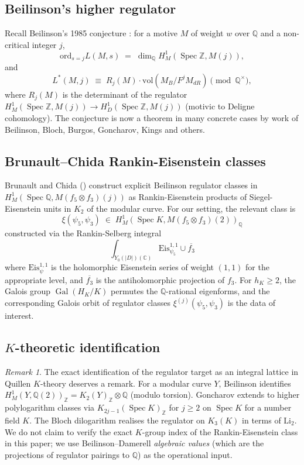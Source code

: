 \documentclass[11pt]{amsart}
\theoremstyle{definition}
\theoremstyle{remark}
\newtheorem{remark}[theorem]{Remark}
\DeclareMathOperator{\Gal}{Gal}
\DeclareMathOperator{\Spec}{Spec}
\newcommand{\Q}{\mathbb{Q}}
\newcommand{\Z}{\mathbb{Z}}
\newcommand{\C}{\mathbb{C}}
\newcommand{\HK}{H_K}
\newcommand{\Li}{\mathrm{Li}}
\begin{document}
\subsection{Beilinson's higher regulator}\label{ss:beilinson-regulator}

Recall Beilinson's 1985 conjecture \cite{Beilinson1985}: for a motive $M$
of weight $w$ over $\Q$ and a non-critical integer $j$,
\[
\mathrm{ord}_{s=j} L(M, s) \;=\; \dim_\Q H^1_M(\Spec \Z, M(j)),
\]
and
\[
L^*(M, j) \;\equiv\; R_j(M) \cdot \mathrm{vol}(M_B / F^j M_{dR})
\pmod{\Q^\times},
\]
where $R_j(M)$ is the determinant of the regulator
$H^1_M(\Spec \Z, M(j)) \to H^1_D(\Spec \Z, M(j))$ (motivic to Deligne
cohomology). The conjecture is now a theorem in many concrete cases by work
of Beilinson, Bloch, Burgos, Goncharov, Kings and others.

\subsection{Brunault--Chida Rankin-Eisenstein classes}\label{ss:brunault-chida}

Brunault and Chida (\cite{BrunaultChida2015}) construct explicit
Beilinson regulator classes in $H^1_M(\Spec \Q, M(f_5 \otimes f_3)(j))$
as Rankin-Eisenstein products of Siegel-Eisenstein units in $K_2$ of the
modular curve. For our setting, the relevant class is
\[
\xi(\psi_5, \psi_3) \;\in\; H^1_M(\Spec K, M(f_5 \otimes f_3)(2))_\Q
\]
constructed via the Rankin-Selberg integral
\[
\int_{Y_0(|D|)(\C)} \mathrm{Eis}^{1,1}_{\psi_5} \cup \overline{f_3}
\]
where $\mathrm{Eis}^{1,1}_\psi$ is the holomorphic Eisenstein
series of weight $(1,1)$ for the appropriate level, and
$\overline{f_3}$ is the antiholomorphic projection of $f_3$.
For $h_K \ge 2$, the Galois group $\Gal(\HK/K)$ permutes the
$\Q$-rational eigenforms, and the corresponding Galois orbit of
regulator classes $\xi^{(j)}(\psi_5, \psi_3)$ is the data of interest.

\subsection{$K$-theoretic identification}\label{ss:K-theory}

\begin{remark}\label{rk:K-theory-index}
The exact identification of the regulator target as an integral lattice
in Quillen $K$-theory deserves a remark. For a modular curve $Y$,
Beilinson identifies $H^1_M(Y, \Q(2))_\Z = K_2(Y)_\Z \otimes \Q$
(modulo torsion). Goncharov \cite{Goncharov2001} extends to higher
polylogarithm classes via $K_{2j-1}(\Spec K)_\Z$ for $j \ge 2$ on
$\Spec K$ for a number field $K$. The Bloch dilogarithm
\cite{Bloch1977} realises the regulator on $K_3(K)$ in terms of
$\Li_2$. We do not claim to verify the exact $K$-group index of the
Rankin-Eisenstein class in this paper; we use Beilinson--Damerell
\emph{algebraic values} (which are the projections of regulator pairings
to $\Q$) as the operational input.
\end{remark}
\end{document}
